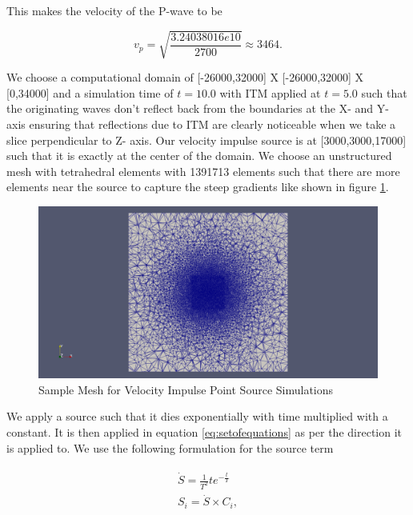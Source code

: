 This makes the velocity of the P-wave to be

\begin{equation}
    v_p = \sqrt{\frac{3.24038016e10}{2700}} \approx 3464 .
\end{equation}

We choose a computational domain of [-26000,32000] X [-26000,32000] X [0,34000] and a simulation time of $t=10.0$ with \ac{ITM} applied at $t=5.0$ 
such that the originating waves don't reflect back from the boundaries at the X- and Y- axis ensuring that
reflections due to \ac{ITM} are clearly noticeable when we take a slice perpendicular to Z- axis. 
Our velocity impulse source is at [3000,3000,17000] such that it is exactly at the center of the domain. 
We choose an unstructured mesh with tetrahedral elements with 1391713 elements such that there are more elements near the source to capture the steep gradients like shown in 
figure \ref{fig:mesh-loh1}.

\begin{figure}
    \centering
    \includegraphics[width=\linewidth]{figures/mesh_loh1.png}
    \caption{Sample Mesh for Velocity Impulse Point Source Simulations}
    \label{fig:mesh-loh1}
\end{figure}

We apply a source such that it dies exponentially with time multiplied with a constant. It is then applied in equation \ref{eq:setofequations} as per the direction
it is applied to. We use the following formulation for the source term

\begin{align}
    \begin{split}
        \dot{S} = \frac{1}{T^2} t e^{-\frac{t}{T}} \\
        S_i = \dot{S} \times C_i ,
    \end{split}
\end{align}

